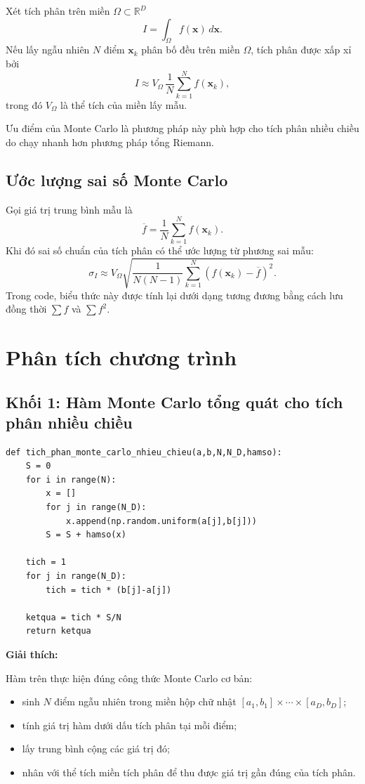 \documentclass{article}
\begin{document}
Xét tích phân trên miền $\Omega \subset \mathbb{R}^D$
\[
I = \int_{\Omega} f(\mathbf{x})\,d\mathbf{x}.
\]
Nếu lấy ngẫu nhiên $N$ điểm $\mathbf{x}_k$ phân bố đều trên miền $\Omega$, tích phân được xấp xỉ bởi
\[
I \approx V_{\Omega}\,\frac{1}{N}\sum_{k=1}^{N} f(\mathbf{x}_k),
\]
trong đó $V_{\Omega}$ là thể tích của miền lấy mẫu.

Ưu điểm của Monte Carlo là phương pháp này phù hợp cho tích phân nhiều chiều do chạy nhanh hơn phương pháp tổng Riemann.

\subsection{Ước lượng sai số Monte Carlo}

Gọi giá trị trung bình mẫu là
\begin{equation*}
\overline{f} = \frac{1}{N}\sum_{k=1}^{N} f(\mathbf{x}_k).
\end{equation*}
Khi đó sai số chuẩn của tích phân có thể ước lượng từ phương sai mẫu:
\begin{equation*}
\sigma_I \approx V_{\Omega}\sqrt{\frac{1}{N(N-1)}\sum_{k=1}^{N}\left(f(\mathbf{x}_k)-\overline{f}\right)^2}.
\end{equation*}
Trong code, biểu thức này được tính lại dưới dạng tương đương bằng cách lưu đồng thời $\sum f$ và $\sum f^2$.

\section{Phân tích chương trình}

\subsection{Khối 1: Hàm Monte Carlo tổng quát cho tích phân nhiều chiều}
\begin{lstlisting}[style=mypython,caption={Hàm Monte Carlo tổng quát dùng cho tích phân nhiều chiều}]
def tich_phan_monte_carlo_nhieu_chieu(a,b,N,N_D,hamso):
    S = 0
    for i in range(N):
        x = []
        for j in range(N_D):
            x.append(np.random.uniform(a[j],b[j]))
        S = S + hamso(x)

    tich = 1
    for j in range(N_D):
        tich = tich * (b[j]-a[j])

    ketqua = tich * S/N
    return ketqua
\end{lstlisting}

\textbf{Giải thích:}

Hàm trên thực hiện đúng công thức Monte Carlo cơ bản:
\begin{itemize}
    \item sinh $N$ điểm ngẫu nhiên trong miền hộp chữ nhật $[a_1,b_1]\times\cdots\times[a_D,b_D]$;
    \item tính giá trị hàm dưới dấu tích phân tại mỗi điểm;
    \item lấy trung bình cộng các giá trị đó;
    \item nhân với thể tích miền tích phân để thu được giá trị gần đúng của tích phân.
\end{itemize}
\end{document}

